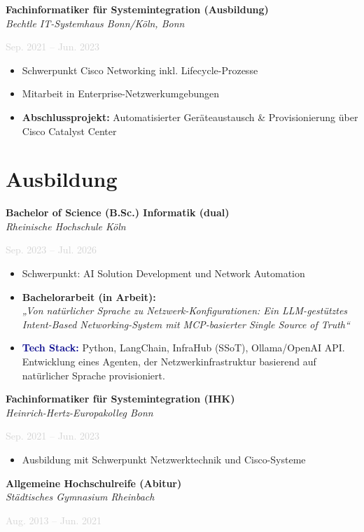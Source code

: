 \documentclass[11pt,a4paper]{article}
\newcommand{\cventry}[5]{
    \noindent
    \begin{minipage}[t]{0.75\textwidth}
        \textbf{#1}\\
        \textit{#2}
    \end{minipage}
    \hfill
    \begin{minipage}[t]{0.23\textwidth}
        \raggedleft\textcolor{lightgray}{#3}
    \end{minipage}
    \par\vspace{2pt}
    \noindent\textcolor{lightgray}{#4}
    \par\vspace{4pt}
    #5
    \par\vspace{8pt}
}
\newcommand{\cveducation}[4]{
    \noindent
    \begin{minipage}[t]{0.75\textwidth}
        \textbf{#1}\\
        \textit{#2}
    \end{minipage}
    \hfill
    \begin{minipage}[t]{0.23\textwidth}
        \raggedleft\textcolor{lightgray}{#3}
    \end{minipage}
    \par\vspace{2pt}
    #4
    \par\vspace{8pt}
}
\begin{document}
\cventry{Fachinformatiker für Systemintegration (Ausbildung)}{Bechtle IT-Systemhaus Bonn/Köln, Bonn}{Sep. 2021 – Jun. 2023}{}{
\begin{itemize}
    \item Schwerpunkt Cisco Networking inkl. Lifecycle-Prozesse
    \item Mitarbeit in Enterprise-Netzwerkumgebungen
    \item \textbf{Abschlussprojekt:} Automatisierter Geräteaustausch \& Provisionierung über Cisco Catalyst Center
\end{itemize}
}

\section*{Ausbildung}

\cveducation{Bachelor of Science (B.Sc.) Informatik (dual)}{Rheinische Hochschule Köln}{Sep. 2023 – Jul. 2026}{
\begin{itemize}
    \item Schwerpunkt: AI Solution Development und Network Automation
    
    \item[] \vspace{2pt} \textbf{Bachelorarbeit (in Arbeit):} \\
    \textit{„Von natürlicher Sprache zu Netzwerk-Konfigurationen: Ein LLM-gestütztes Intent-Based Networking-System mit MCP-basierter Single Source of Truth“}
    
    \item[] \footnotesize{\textcolor{darkblue}{\textbf{Tech Stack:}} Python, LangChain, InfraHub (SSoT), Ollama/OpenAI API. Entwicklung eines Agenten, der Netzwerkinfrastruktur basierend auf natürlicher Sprache provisioniert.}
\end{itemize}
}

\cveducation{Fachinformatiker für Systemintegration (IHK)}{Heinrich-Hertz-Europakolleg Bonn}{Sep. 2021 – Jun. 2023}{
\begin{itemize}
    \item Ausbildung mit Schwerpunkt Netzwerktechnik und Cisco-Systeme
\end{itemize}
}

\cveducation{Allgemeine Hochschulreife (Abitur)}{Städtisches Gymnasium Rheinbach}{Aug. 2013 – Jun. 2021}{
}
\end{document}
